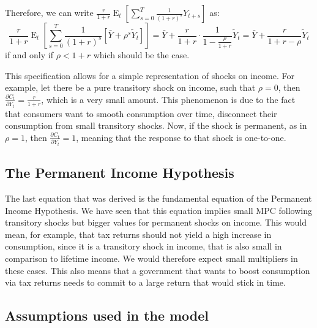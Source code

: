 \documentclass[12pt]{report}
\newcommand{\Et}[1]{\operatorname{E}_t\left[#1\right]}
\begin{document}
Therefore, we can write $\frac{r}{1+r} \Et{\sum_{s=0}^{T} \frac{1}{(1+r)^{s}}Y_{t+s}}$ as: $$\frac{r}{1+r} \Et{\sum_{s=0}^{T} \frac{1}{(1+r)^{s}}[\bar Y + \rho^s \tilde Y_t]} = \bar Y + \frac{r}{1+r}\cdot \frac{1}{1 - \frac{\rho}{1+r}} \tilde Y_t  = \bar Y + \frac{r}{1+r - \rho}\tilde Y_t$$ if and only if $\rho < 1+r $ which should be the case.

This specification allows for a simple representation of shocks on income. For example, let there be a pure transitory shock on income, such that $\rho = 0$, then $\frac{\partial C_t}{\partial Y_t} = \frac{r}{1+r}$, which is a very small amount. This phenomenon is due to the fact that consumers want to smooth consumption over time, disconnect their consumption from small transitory shocks. Now, if the shock is permanent, as in $\rho = 1$, then $\frac{\partial C_t}{\partial Y_t} = 1$, meaning that the response to that shock is one-to-one.

\subsection{The Permanent Income Hypothesis}

The last equation that was derived is the fundamental equation of the Permanent Income Hypothesis. We have seen that this equation implies small MPC following transitory shocks but bigger values for permanent shocks on income. This would mean, for example, that tax returns should not yield a high increase in consumption, since it is a transitory shock in income, that is also small in comparison to lifetime income. We would therefore expect small multipliers in these cases. This also means that a government that wants to boost consumption via tax returns needs to commit to a large return that would stick in time.


\subsection{Assumptions used in the model}
\end{document}
